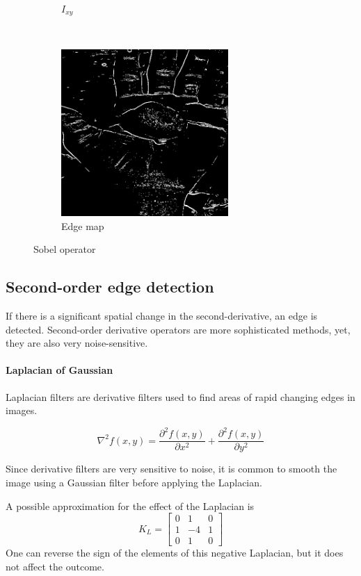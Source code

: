 \documentclass[12pt]{article}
\begin{document}
\begin{figure}[H]
\begin{subfigure}[t]{0.5\textwidth}
        \caption{$I_{xy}$}
    \end{subfigure}%
    ~
    \begin{subfigure}[t]{0.5\textwidth}
        \centering
        \includegraphics[height=2.5in]{images/sobel_edge}
        \caption{Edge map}
    \end{subfigure}
    \caption{Sobel operator}
\end{figure}

\subsection*{Second-order edge detection}
If there is a significant spatial change in the second-derivative, an edge is detected. Second-order derivative operators are more sophisticated methods, yet, they are also very noise-sensitive. 

\paragraph*{Laplacian of Gaussian}
Laplacian filters are derivative filters used to find areas of rapid changing edges in images.

\begin{equation}
	\nabla^2 f(x, y) = \frac{\partial^2 f(x, y)}{\partial x^2} + \frac{\partial^2 f(x, y)}{\partial y^2}
\end{equation}

Since derivative filters are very sensitive to noise, it is common to smooth the image using a Gaussian filter before applying the Laplacian.

A possible approximation for the effect of the Laplacian is 
\begin{equation}
	K_L = \begin{bmatrix}
		0 & 1 & 0 \\ 1 & -4 & 1 \\ 0 & 1 & 0
	\end{bmatrix}
\end{equation}
One can reverse the sign of the elements of this negative Laplacian, but it does not affect the outcome.
\end{document}
